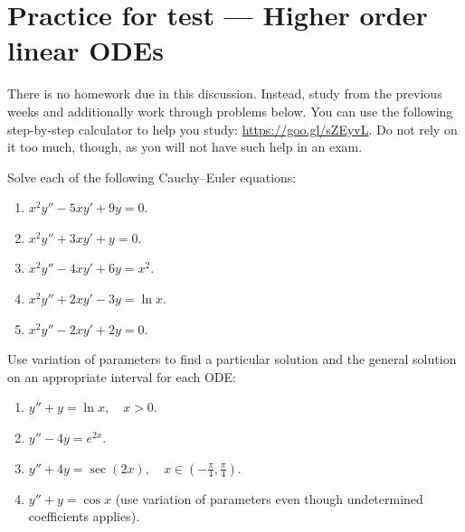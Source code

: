 \section*{Practice for test --- Higher order linear ODEs}

  There is no homework due in this discussion. Instead, study from the previous weeks and additionally work through problems below.
  You can use the following step-by-step calculator to help you study: \url{https://goo.gl/sZEyvL}.
  Do not rely on it too much, though, as you will not have such help in an exam.


  \begin{question}
    Solve each of the following Cauchy--Euler equations:
    \begin{enumerate}
      \item $x^2 y'' - 5x y' + 9y = 0.$
      \item $x^2 y'' + 3x y' + y = 0.$
      \item $x^2 y'' - 4x y' + 6y = x^2.$
      \item $x^2 y'' + 2x y' - 3y = \ln x.$
      \item $x^2 y'' - 2x y' + 2y = 0.$
    \end{enumerate}
  \end{question}


  \begin{question}
    Use variation of parameters to find a particular solution and the general solution on an appropriate interval for each ODE:
    \begin{enumerate}
      \item $y''+y=\ln x,\quad x>0$.
      \item $y''-4y = e^{2x}$.
      \item $y''+4y=\sec(2x),\quad x\in(-\tfrac{\pi}{4},\tfrac{\pi}{4})$.
      \item $y''+y=\cos x$ (use variation of parameters even though undetermined coefficients applies).
    \end{enumerate}
  \end{question}


